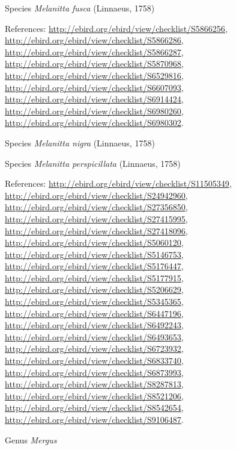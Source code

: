 \documentclass[9pt, article]{memoir}
\begin{document}
\begin{multicols}{2}
\vspace{6pt}\noindent\hspace{36pt}Species \textit{Melanitta fusca} (Linnaeus, 1758)


\vspace{6pt}References: 
\url{http://ebird.org/ebird/view/checklist/S5866256}, 
\url{http://ebird.org/ebird/view/checklist/S5866286}, 
\url{http://ebird.org/ebird/view/checklist/S5866287}, 
\url{http://ebird.org/ebird/view/checklist/S5870968}, 
\url{http://ebird.org/ebird/view/checklist/S6529816}, 
\url{http://ebird.org/ebird/view/checklist/S6607093}, 
\url{http://ebird.org/ebird/view/checklist/S6914424}, 
\url{http://ebird.org/ebird/view/checklist/S6980260}, 
\url{http://ebird.org/ebird/view/checklist/S6980302}.

\vspace{6pt}\noindent\hspace{36pt}Species \textit{Melanitta nigra} (Linnaeus, 1758)


\vspace{6pt}\noindent\hspace{36pt}Species \textit{Melanitta perspicillata} (Linnaeus, 1758)


\vspace{6pt}References: 
\url{http://ebird.org/ebird/view/checklist/S11505349}, 
\url{http://ebird.org/ebird/view/checklist/S24942960}, 
\url{http://ebird.org/ebird/view/checklist/S27356850}, 
\url{http://ebird.org/ebird/view/checklist/S27415995}, 
\url{http://ebird.org/ebird/view/checklist/S27418096}, 
\url{http://ebird.org/ebird/view/checklist/S5060120}, 
\url{http://ebird.org/ebird/view/checklist/S5146753}, 
\url{http://ebird.org/ebird/view/checklist/S5176447}, 
\url{http://ebird.org/ebird/view/checklist/S5177915}, 
\url{http://ebird.org/ebird/view/checklist/S5206629}, 
\url{http://ebird.org/ebird/view/checklist/S5345365}, 
\url{http://ebird.org/ebird/view/checklist/S6447196}, 
\url{http://ebird.org/ebird/view/checklist/S6492243}, 
\url{http://ebird.org/ebird/view/checklist/S6493653}, 
\url{http://ebird.org/ebird/view/checklist/S6723932}, 
\url{http://ebird.org/ebird/view/checklist/S6833740}, 
\url{http://ebird.org/ebird/view/checklist/S6873993}, 
\url{http://ebird.org/ebird/view/checklist/S8287813}, 
\url{http://ebird.org/ebird/view/checklist/S8521206}, 
\url{http://ebird.org/ebird/view/checklist/S8542654}, 
\url{http://ebird.org/ebird/view/checklist/S9106487}.

\vspace{6pt}\noindent\hspace{30pt}Genus \textit{Mergus}



\end{multicols}
\end{document}
